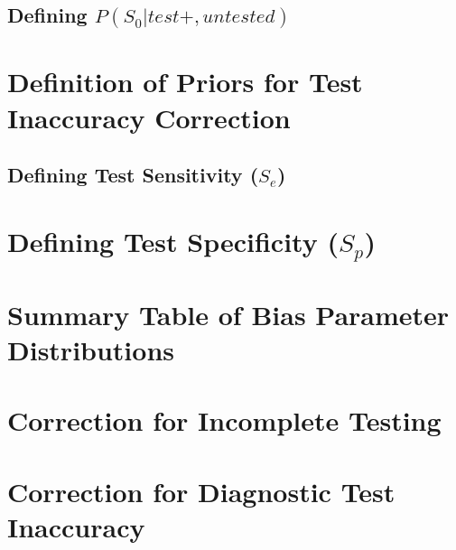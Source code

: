\documentclass[12pt,twoside]{smiththesis}
\begin{document}
\hypertarget{defining-ps_0testuntested}{%
\subsection{\texorpdfstring{Defining \(P(S_0|test+,untested)\)}{Defining P(S\_0\textbar test+,untested)}}\label{defining-ps_0testuntested}}

\hypertarget{definition-of-priors-for-test-inaccuracy-correction}{%
\section{Definition of Priors for Test Inaccuracy Correction}\label{definition-of-priors-for-test-inaccuracy-correction}}

\hypertarget{defining-test-sensitivity-s_e}{%
\subsection{\texorpdfstring{Defining Test Sensitivity (\(S_e\))}{Defining Test Sensitivity (S\_e)}}\label{defining-test-sensitivity-s_e}}

\hypertarget{defining-test-specificity-s_p}{%
\section{\texorpdfstring{Defining Test Specificity (\(S_p\))}{Defining Test Specificity (S\_p)}}\label{defining-test-specificity-s_p}}

\hypertarget{summary-table-of-bias-parameter-distributions}{%
\section{Summary Table of Bias Parameter Distributions}\label{summary-table-of-bias-parameter-distributions}}

\hypertarget{correction-for-incomplete-testing}{%
\section{Correction for Incomplete Testing}\label{correction-for-incomplete-testing}}

\hypertarget{correction-for-diagnostic-test-inaccuracy}{%
\section{Correction for Diagnostic Test Inaccuracy}\label{correction-for-diagnostic-test-inaccuracy}}
\end{document}
